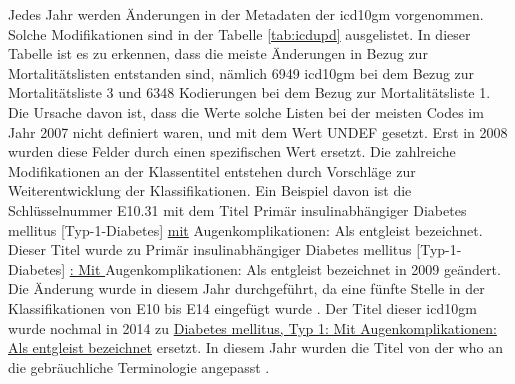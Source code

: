 Jedes Jahr werden Änderungen in der Metadaten der \ac{icd10gm} vorgenommen. Solche Modifikationen sind in der Tabelle \ref{tab:icdupd} ausgelistet. In dieser Tabelle ist es zu erkennen, dass die meiste Änderungen in Bezug zur Mortalitätslisten entstanden sind, nämlich \textsf{6949} \ac{icd10gm} bei dem Bezug zur Mortalitätsliste 3 und \textsf{6348} Kodierungen bei dem Bezug zur Mortalitätsliste 1. Die Ursache davon ist, dass die Werte solche Listen bei der meisten Codes im Jahr 2007 nicht definiert waren, und mit dem Wert \textsf{UNDEF} gesetzt. Erst in 2008 wurden diese Felder durch einen spezifischen Wert ersetzt. Die zahlreiche Modifikationen an der Klassentitel entstehen durch Vorschläge zur Weiterentwicklung der Klassifikationen. Ein Beispiel davon ist die Schlüsselnummer \textsf{E10.31} mit dem Titel \textsf{Primär insulinabhängiger Diabetes mellitus [Typ-1-Diabetes] \underline{mit} Augenkomplikationen: Als entgleist bezeichnet}. Dieser Titel wurde zu \textsf{Primär insulinabhängiger Diabetes mellitus [Typ-1-Diabetes] \underline{: Mit } Augenkomplikationen: Als entgleist bezeichnet} in 2009 geändert. Die Änderung wurde in diesem Jahr durchgeführt, da eine fünfte Stelle in der Klassifikationen von \textsf{E10}  bis \textsf{E14} eingefügt wurde \cite{diab09}. Der Titel dieser \ac{icd10gm} wurde nochmal in 2014 zu \textsf{\underline{Diabetes mellitus, Typ 1: Mit Augenkomplikationen: Als entgleist bezeichnet}} ersetzt. In diesem Jahr wurden die Titel von der \ac{who} an die gebräuchliche Terminologie angepasst \cite{komm14}.



